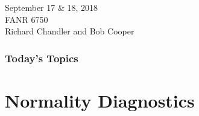 \documentclass[color=usenames,dvipsnames]{beamer}\usepackage[]{graphicx}\usepackage[]{color}
\begin{document}

\begin{frame}[plain]
  \LARGE
  \centering \par
  {\bf \color{RoyalBlue}{Lab 5 -- Assumptions of ANOVA}} \par
  \vspace{1cm}
  \Large
  September 17 \& 18, 2018 \\
  FANR 6750 \\
  \vfill
  \large
  Richard Chandler and Bob Cooper
\end{frame}





\begin{frame}[plain]
  \frametitle{Today's Topics}
  \Large
\end{frame}






\section{Normality Diagnostics}
\end{document}
